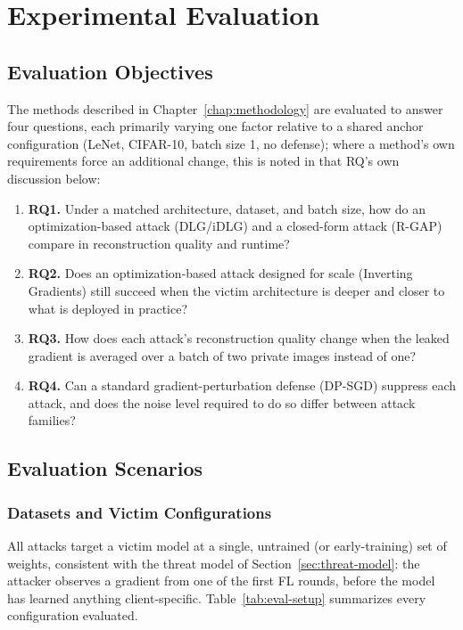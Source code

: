 \chapter{Experimental Evaluation}
\label{chap:experiment}

\section{Evaluation Objectives}
\label{sec:eval-objectives}

The methods described in Chapter~\ref{chap:methodology} are evaluated to answer four
questions, each primarily varying one factor relative to a shared anchor configuration
(LeNet, CIFAR-10, batch size 1, no defense); where a method's own requirements force an
additional change, this is noted in that RQ's own discussion below:

\begin{enumerate}[leftmargin=1.6em]
  \item \textbf{RQ1.} Under a matched architecture, dataset, and batch size, how do an
  optimization-based attack (DLG/iDLG) and a closed-form attack (R-GAP) compare in
  reconstruction quality and runtime?
  \item \textbf{RQ2.} Does an optimization-based attack designed for scale (Inverting
  Gradients) still succeed when the victim architecture is deeper and closer to what is
  deployed in practice?
  \item \textbf{RQ3.} How does each attack's reconstruction quality change when the
  leaked gradient is averaged over a batch of two private images instead of one?
  \item \textbf{RQ4.} Can a standard gradient-perturbation defense (DP-SGD) suppress
  each attack, and does the noise level required to do so differ between attack
  families?
\end{enumerate}

\section{Evaluation Scenarios}
\label{sec:eval-scenarios}

\FloatBarrier
\subsection{Datasets and Victim Configurations}
\label{sec:eval-setup}

All attacks target a victim model at a single, untrained (or early-training) set of
weights, consistent with the threat model of Section~\ref{sec:threat-model}: the
attacker observes a gradient from one of the first FL rounds, before the model has
learned anything client-specific. Table~\ref{tab:eval-setup} summarizes every
configuration evaluated.

